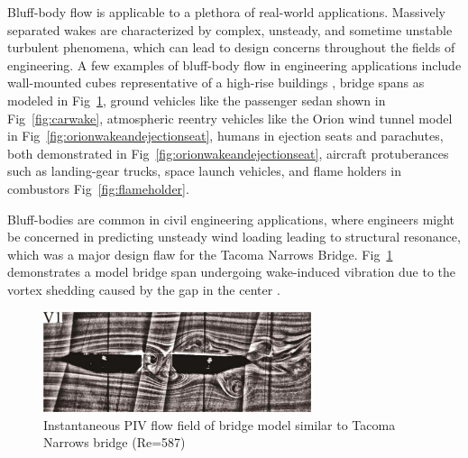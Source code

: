 \documentclass[journal]{new-aiaa}
\begin{document}

Bluff-body flow is applicable to a plethora of real-world applications.  Massively separated wakes are characterized by complex, unsteady, and sometime unstable turbulent phenomena, which can lead to design concerns throughout the fields of engineering. A few examples of bluff-body flow in engineering applications include wall-mounted cubes representative of a high-rise buildings \cite{elkhoury2016assessment}, bridge spans \cite{yuan2017investigation} as modeled in Fig~\ref{fig:tacomanarrowswake}, ground vehicles \cite{mendonca2002towards} like the passenger sedan shown in Fig~\ref{fig:carwake}, atmospheric reentry vehicles \cite{ross2013comprehensive} like the Orion wind tunnel model in Fig~\ref{fig:orionwakeandejectionseat}, humans in ejection seats and parachutes, both demonstrated in Fig~\ref{fig:orionwakeandejectionseat}, aircraft protuberances such as landing-gear trucks, space launch vehicles, and flame holders \cite{tanaka2013bluff} in combustors Fig~\ref{fig:flameholder}.

Bluff-bodies are common in civil engineering applications, where engineers might be concerned in predicting unsteady wind loading leading to structural resonance, which was a major design flaw for the Tacoma Narrows Bridge.  Fig~\ref{fig:tacomanarrowswake} demonstrates a model bridge span undergoing wake-induced vibration due to the vortex shedding caused by the gap in the center \cite{yuan2017investigation}.

\begin{figure}[htb]
\begin{center}
\includegraphics[width=0.7\textwidth]{Images/logan/yuan2017investigation_TacomaNarrowsWake.pdf}
\caption{ Instantaneous PIV flow field of bridge model similar to Tacoma Narrows bridge (Re=587) \cite{yuan2017investigation} }
\label{fig:tacomanarrowswake}
\end{center}
\end{figure}
\end{document}
